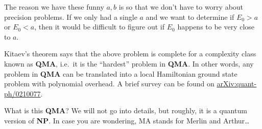 \documentclass[a4paper]{article}
\begin{document}
The reason we have these funny $a, b$ is so that we don't have to worry about precision problems. If we only had a single $a$ and we want to determine if $E_0 > a$ or $E_0 < a$, then it would be difficult to figure out if $E_0$ happens to be very close to $a$.

Kitaev's theorem says that the above problem is complete for a complexity class known as \textbf{QMA}, i.e.\ it is the ``hardest'' problem in \textbf{QMA}. In other words, any problem in \textbf{QMA} can be translated into a local Hamiltonian ground state problem with polynomial overhead. A brief survey can be found on \href{https://arxiv.org/abs/quant-ph/0210077}{arXiv:{}quant-ph/0210077}.

What is this \textbf{QMA}? We will not go into details, but roughly, it is a quantum version of \textbf{NP}. In case you are wondering, MA stands for Merlin and Arthur\ldots
\printindex
\end{document}
